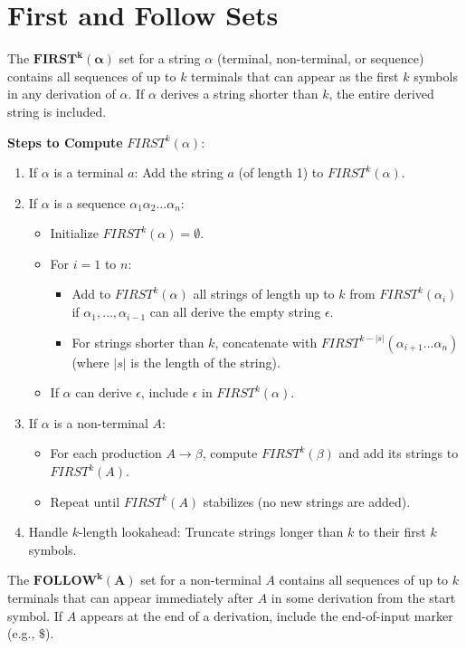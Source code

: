\section{First and Follow Sets}

The $\mathbf{FIRST^k(\alpha)}$ set for a string $\alpha$ (terminal, non-terminal, or sequence) contains all sequences of up to $k$ terminals that can appear as the first $k$ symbols in any derivation of $\alpha$. If $\alpha$ derives a string shorter than $k$, the entire derived string is included.

\textbf{Steps to Compute} $FIRST^k(\alpha)$:
\begin{enumerate}
\item If $\alpha$ is a terminal $a$: Add the string $a$ (of length 1) to $FIRST^k(\alpha)$.
\item If $\alpha$ is a sequence $\alpha_1 \alpha_2 \dots \alpha_n$:
   \begin{itemize}
   \item Initialize $FIRST^k(\alpha) = \emptyset$.
   \item For $i = 1$ to $n$:
     \begin{itemize}
     \item Add to $FIRST^k(\alpha)$ all strings of length up to $k$ from $FIRST^k(\alpha_i)$ if $\alpha_1, \dots, \alpha_{i-1}$ can all derive the empty string $\epsilon$.
     \item For strings shorter than $k$, concatenate with $FIRST^{k-|s|}(\alpha_{i+1} \dots \alpha_n)$ (where $|s|$ is the length of the string).
     \end{itemize}
   \item If $\alpha$ can derive $\epsilon$, include $\epsilon$ in $FIRST^k(\alpha)$.
   \end{itemize}
\item If $\alpha$ is a non-terminal $A$:
   \begin{itemize}
   \item For each production $A \to \beta$, compute $FIRST^k(\beta)$ and add its strings to $FIRST^k(A)$.
   \item Repeat until $FIRST^k(A)$ stabilizes (no new strings are added).
   \end{itemize}
\item Handle $k$-length lookahead: Truncate strings longer than $k$ to their first $k$ symbols.
\end{enumerate}

The $\mathbf{FOLLOW^k(A)}$ set for a non-terminal $A$ contains all sequences of up to $k$ terminals that can appear immediately after $A$ in some derivation from the start symbol. If $A$ appears at the end of a derivation, include the end-of-input marker (e.g., $\$$).

